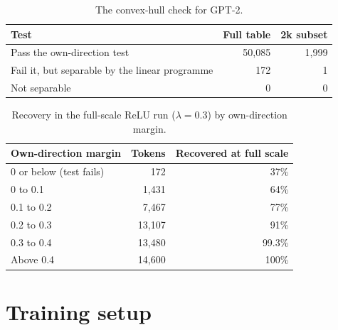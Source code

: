 \documentclass[11pt]{article}
\begin{document}
\begin{table}[h]
\centering
\begin{tabular}{lrr}
\toprule
Test & Full table & 2k subset \\
\midrule
Pass the own-direction test & 50,085 & 1,999 \\
Fail it, but separable by the linear programme & 172 & 1 \\
Not separable & 0 & 0 \\
\bottomrule
\end{tabular}
\caption{The convex-hull check for GPT-2.}
\label{tab:hull}
\end{table}

\begin{table}[h]
\centering
\begin{tabular}{lrr}
\toprule
Own-direction margin & Tokens & Recovered at full scale \\
\midrule
0 or below (test fails) & 172 & 37\% \\
0 to 0.1 & 1,431 & 64\% \\
0.1 to 0.2 & 7,467 & 77\% \\
0.2 to 0.3 & 13,107 & 91\% \\
0.3 to 0.4 & 13,480 & 99.3\% \\
Above 0.4 & 14,600 & 100\% \\
\bottomrule
\end{tabular}
\caption{Recovery in the full-scale ReLU run ($\lambda = 0.3$) by own-direction margin.}
\label{tab:margin}
\end{table}

\section{Training setup}
\label{app:setup}
\end{document}
